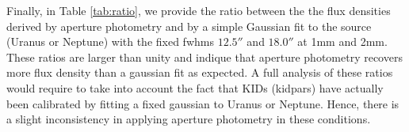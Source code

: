 






Finally, in Table \ref{tab:ratio}, we provide the ratio between the 
the flux densities derived by aperture photometry and by a simple Gaussian fit to the source (Uranus or Neptune) with the fixed fwhms $12.5''$ and $18.0''$
at 1mm and 2mm.
These ratios are larger than unity and indique that aperture photometry recovers more flux density than  a gaussian fit as expected. A  full analysis
of these ratios would require to take into account the fact that KIDs (kidpars) have actually been calibrated by fitting a fixed gaussian to Uranus 
or Neptune. Hence, there is a slight inconsistency in applying aperture photometry in these conditions.    



